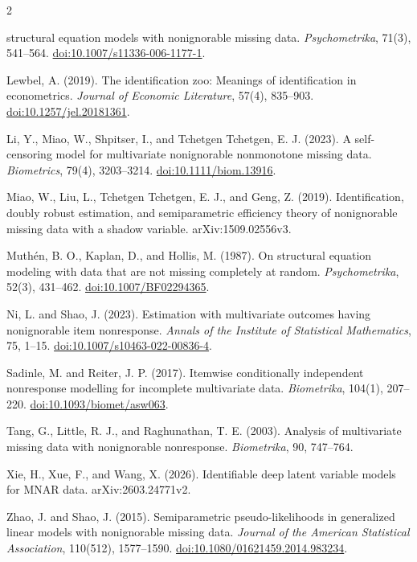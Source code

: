 \documentclass[a4paper,10pt]{article}
\begin{document}
\begin{multicols}{2}
\begin{enumerate}[label={[\arabic*]},leftmargin=7mm,itemsep=0.35em,topsep=0.2em,
  parsep=0pt,partopsep=0pt]
structural equation models with nonignorable missing data.
\textit{Psychometrika}, 71(3), 541--564.
\href{https://doi.org/10.1007/s11336-006-1177-1}{doi:10.1007/s11336-006-1177-1}.
\item Lewbel, A. (2019). The identification zoo: Meanings of identification
in econometrics. \textit{Journal of Economic Literature}, 57(4), 835--903.
\href{https://doi.org/10.1257/jel.20181361}{doi:10.1257/jel.20181361}.
\item Li, Y., Miao, W., Shpitser, I., and Tchetgen Tchetgen, E. J. (2023).
A self-censoring model for multivariate nonignorable nonmonotone missing data.
\textit{Biometrics}, 79(4), 3203--3214.
\href{https://doi.org/10.1111/biom.13916}{doi:10.1111/biom.13916}.
\item Miao, W., Liu, L., Tchetgen Tchetgen, E. J., and Geng, Z. (2019).
Identification, doubly robust estimation, and semiparametric efficiency theory
of nonignorable missing data with a shadow variable. arXiv:1509.02556v3.
\item Muth\'en, B. O., Kaplan, D., and Hollis, M. (1987). On structural
equation modeling with data that are not missing completely at random.
\textit{Psychometrika}, 52(3), 431--462.
\href{https://doi.org/10.1007/BF02294365}{doi:10.1007/BF02294365}.
\item Ni, L. and Shao, J. (2023). Estimation with multivariate outcomes having
nonignorable item nonresponse. \textit{Annals of the Institute of Statistical
Mathematics}, 75, 1--15.
\href{https://doi.org/10.1007/s10463-022-00836-4}{doi:10.1007/s10463-022-00836-4}.
\item Sadinle, M. and Reiter, J. P. (2017). Itemwise conditionally independent
nonresponse modelling for incomplete multivariate data. \textit{Biometrika},
104(1), 207--220.
\href{https://doi.org/10.1093/biomet/asw063}{doi:10.1093/biomet/asw063}.
\item Tang, G., Little, R. J., and Raghunathan, T. E. (2003). Analysis of
multivariate missing data with nonignorable nonresponse. \textit{Biometrika},
90, 747--764.
\item Xie, H., Xue, F., and Wang, X. (2026). Identifiable deep latent variable
models for MNAR data. arXiv:2603.24771v2.
\item Zhao, J. and Shao, J. (2015). Semiparametric pseudo-likelihoods in
generalized linear models with nonignorable missing data. \textit{Journal of
the American Statistical Association}, 110(512), 1577--1590.
\href{https://doi.org/10.1080/01621459.2014.983234}{doi:10.1080/01621459.2014.983234}.
\end{enumerate}

\end{multicols}
\end{document}
